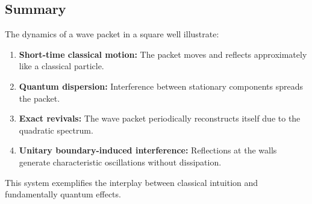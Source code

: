 \subsection{Summary}

The dynamics of a wave packet in a square well illustrate:
\begin{enumerate}
    \item \textbf{Short-time classical motion:} The packet moves and reflects approximately like a classical particle.
    \item \textbf{Quantum dispersion:} Interference between stationary components spreads the packet.
    \item \textbf{Exact revivals:} The wave packet periodically reconstructs itself due to the quadratic spectrum.
    \item \textbf{Unitary boundary-induced interference:} Reflections at the walls generate characteristic oscillations without dissipation.
\end{enumerate}
This system exemplifies the interplay between classical intuition and fundamentally quantum effects.
